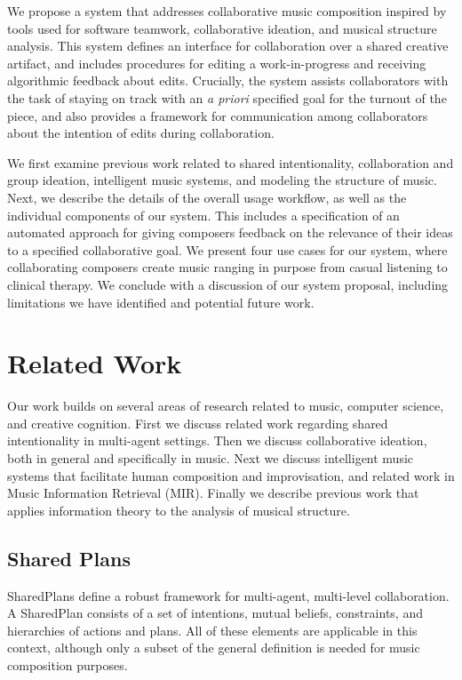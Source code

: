 \documentclass[final,authoryear,5p,times,twocolumn]{elsarticle}
\begin{document}
We propose a system that addresses collaborative music composition inspired by tools used for software teamwork, collaborative ideation, and musical structure analysis. This system defines an interface for collaboration over a shared creative artifact, and includes procedures for editing a work-in-progress and receiving algorithmic  feedback about edits. Crucially, the system assists collaborators with the task of staying on track with an \textit{a priori} specified goal for the turnout of the piece, and also provides a framework for communication among collaborators about the intention of edits during collaboration.

We first examine previous work related to shared intentionality, collaboration and group ideation, intelligent music systems, and modeling the structure of music. Next, we describe the details of the overall usage workflow, as well as the individual components of our system. This includes a specification of an automated approach for giving composers feedback on the relevance of their ideas to a specified collaborative goal. We present four use cases for our system, where collaborating composers create music ranging in purpose from casual listening to clinical therapy. We conclude with a discussion of our system proposal, including limitations we have identified and potential future work.

\section{Related Work}

Our work builds on several areas of research related to music, computer science, and creative cognition. First we discuss related work regarding shared intentionality in multi-agent settings. Then we discuss collaborative ideation, both in general and specifically in music. Next we discuss intelligent music systems that facilitate human composition and improvisation, and related work in Music Information Retrieval (MIR). Finally we describe previous work that applies information theory to the analysis of musical structure.

\subsection{Shared Plans}

SharedPlans \citep{grosz1996collaborative, hunsberger1998making} define a robust framework for multi-agent, multi-level collaboration. A SharedPlan consists of a set of intentions, mutual beliefs, constraints, and hierarchies of actions and plans. All of these elements are applicable in this context, although only a subset of the general definition is needed for music composition purposes. 
\end{document}
